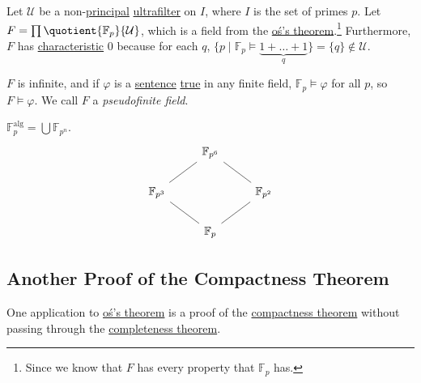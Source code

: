 \begin{eg}
	Let \(\mathcal{U} \) be a non-\hyperref[eg:principal-filter]{principal} \hyperref[def:ultrafilter]{ultrafilter} on \(I\), where \(I\) is the set of primes \(p\). Let \(F = \prod \quotient{\mathbb{F} _p}{\mathcal{U} } \), which is a field from the \hyperref[thm:Los]{oś's theorem}.\footnote{Since we know that \(F\) has every property that \(\mathbb{F} _p\) has.} Furthermore, \(F\) has \hyperref[def:characteristic]{characteristic} \(0\) because for each \(q\), \(\{ p \mid \mathbb{F} _p \models \underbrace{1 + \dots + 1}_{q} \} = \{ q \} \notin \mathcal{U} \).

	\(F\) is infinite, and if \(\varphi \) is a \hyperref[def:sentence]{sentence} \hyperref[def:truth]{true} in any finite field, \(\mathbb{F} _p \models \varphi \) for all \(p\), so \(F \models \varphi \). We call \(F\) a \emph{pseudofinite field}.
\end{eg}

\begin{note}
	\(\mathbb{F} _p^{\mathrm{alg} } = \bigcup \mathbb{F} _{p^n}\).
	\[\begin{tikzcd}
			& {\mathbb{F}_{p^6}} \\
			{\mathbb{F}_{p^3}} && {\mathbb{F}_{p^2}} \\
			& {\mathbb{F}_{p}}
			\arrow[no head, from=3-2, to=2-3]
			\arrow[no head, from=2-3, to=1-2]
			\arrow[no head, from=2-1, to=1-2]
			\arrow[no head, from=3-2, to=2-1]
		\end{tikzcd}\]
\end{note}

\subsection{Another Proof of the Compactness Theorem}
One application to \hyperref[thm:Los]{oś's theorem} is a proof of the \hyperref[thm:compactness]{compactness theorem} without passing through the \hyperref[thm:completeness]{completeness theorem}.

